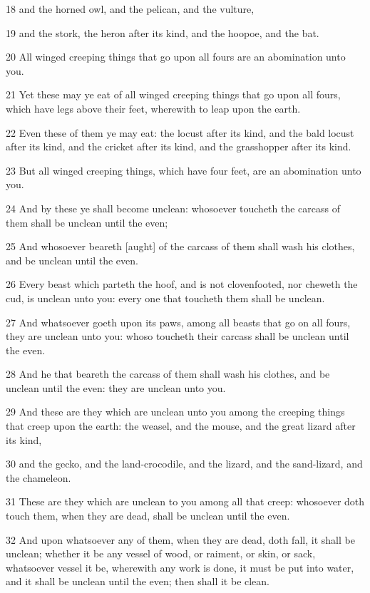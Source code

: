 \par 18 and the horned owl, and the pelican, and the vulture,
\par 19 and the stork, the heron after its kind, and the hoopoe, and the bat.
\par 20 All winged creeping things that go upon all fours are an abomination unto you.
\par 21 Yet these may ye eat of all winged creeping things that go upon all fours, which have legs above their feet, wherewith to leap upon the earth.
\par 22 Even these of them ye may eat: the locust after its kind, and the bald locust after its kind, and the cricket after its kind, and the grasshopper after its kind.
\par 23 But all winged creeping things, which have four feet, are an abomination unto you.
\par 24 And by these ye shall become unclean: whosoever toucheth the carcass of them shall be unclean until the even;
\par 25 And whosoever beareth [aught] of the carcass of them shall wash his clothes, and be unclean until the even.
\par 26 Every beast which parteth the hoof, and is not clovenfooted, nor cheweth the cud, is unclean unto you: every one that toucheth them shall be unclean.
\par 27 And whatsoever goeth upon its paws, among all beasts that go on all fours, they are unclean unto you: whoso toucheth their carcass shall be unclean until the even.
\par 28 And he that beareth the carcass of them shall wash his clothes, and be unclean until the even: they are unclean unto you.
\par 29 And these are they which are unclean unto you among the creeping things that creep upon the earth: the weasel, and the mouse, and the great lizard after its kind,
\par 30 and the gecko, and the land-crocodile, and the lizard, and the sand-lizard, and the chameleon.
\par 31 These are they which are unclean to you among all that creep: whosoever doth touch them, when they are dead, shall be unclean until the even.
\par 32 And upon whatsoever any of them, when they are dead, doth fall, it shall be unclean; whether it be any vessel of wood, or raiment, or skin, or sack, whatsoever vessel it be, wherewith any work is done, it must be put into water, and it shall be unclean until the even; then shall it be clean.

